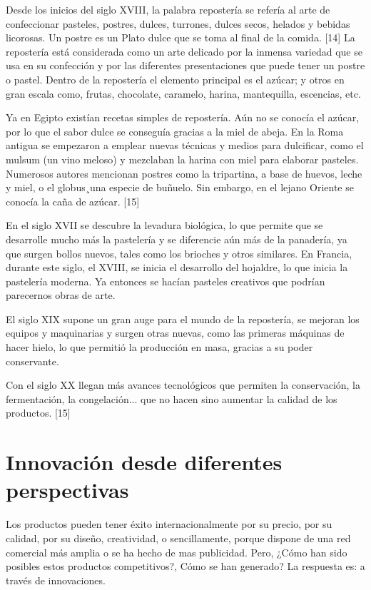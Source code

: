 \documentclass{bmcart}
\begin{document}
Desde los inicios del siglo XVIII, la palabra repostería se refería al arte de confeccionar pasteles, postres, dulces, turrones, dulces secos, helados y bebidas licorosas. Un postre es un Plato dulce que se toma al final de la comida. [14]
La repostería está considerada como un arte delicado por la inmensa variedad que se usa en su confección y por las diferentes presentaciones que puede tener un postre o pastel.
Dentro de la repostería el elemento principal es el azúcar; y otros en gran escala como, frutas, chocolate, caramelo, harina, mantequilla, escencias, etc.

Ya en Egipto existían recetas simples de repostería. Aún no se conocía el azúcar, por lo que el sabor dulce se conseguía gracias a la miel de abeja.
En la Roma antigua se empezaron a emplear nuevas técnicas y medios para dulcificar, como el mulsum (un vino meloso) y mezclaban la harina con miel para elaborar pasteles. Numerosos autores mencionan postres como la tripartina, a base de huevos, leche y miel, o el globus¸una especie de buñuelo. Sin embargo, en el lejano Oriente se conocía la caña de azúcar. [15]

En el siglo XVII se descubre la levadura biológica, lo que permite que se desarrolle mucho más la pastelería y se diferencie aún más de la panadería, ya que surgen bollos nuevos, tales como los brioches y otros similares.
En Francia, durante este siglo, el XVIII, se inicia el desarrollo del hojaldre, lo que inicia la pastelería moderna. Ya entonces se hacían pasteles creativos que podrían parecernos obras de arte. 

El siglo XIX supone un gran auge para el mundo de la repostería, se mejoran los equipos y maquinarias y surgen otras nuevas, como las primeras máquinas de hacer hielo, lo que permitió la producción en masa, gracias a su poder conservante.

Con el siglo XX llegan más avances tecnológicos que permiten la conservación, la fermentación, la congelación... que no hacen sino aumentar la calidad de los productos. [15]


\section{Innovación desde diferentes perspectivas}

Los productos pueden tener éxito internacionalmente por su precio, por su calidad, por su diseño, creatividad, o sencillamente, porque dispone de una red comercial más amplia o se ha hecho de mas publicidad. Pero, ¿Cómo han sido posibles estos productos competitivos?, Cómo se han generado? La respuesta es: a través de innovaciones.
\end{document}
